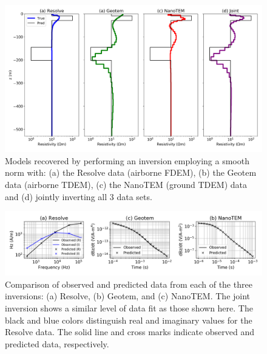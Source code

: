 \documentclass[paper]{geophysics}
\begin{document}
\begin{figure}
    \begin{center}
    \includegraphics[width=0.8\columnwidth]{figures/independent-inversions.png}
    \end{center}
\caption{
    Models recovered by performing an inversion employing a smooth norm with: (a) the Resolve data (airborne FDEM), (b) the Geotem data (airborne TDEM), (c) the NanoTEM (ground TDEM) data and (d) jointly inverting all 3 data sets.
}
\label{fig:independent-inversions}
\end{figure}

\begin{figure}
    \begin{center}
    \includegraphics[width=\columnwidth]{figures/obs-vs-pred.png}
    \end{center}
\caption{
    Comparison of observed and predicted data from each of the three inversions: (a) Resolve, (b) Geotem, and (c) NanoTEM. The joint inversion shows a similar level of data fit as those shown here. The black and blue colors distinguish real and imaginary values for the Resolve data. The solid line and cross marks indicate observed and predicted data, respectively.
}
\label{fig:obs-vs-pred}
\end{figure}


\end{document}
